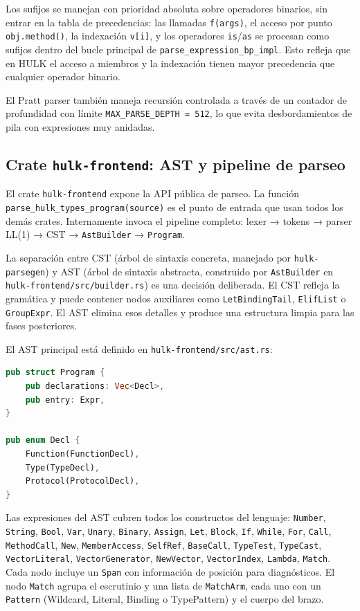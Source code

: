 \documentclass[12pt,letterpaper]{article}
\newcommand{\hulk}{\textsc{HULK}}
\newcommand{\src}[1]{\texttt{#1}}
\begin{document}
Los sufijos se manejan con prioridad absoluta sobre operadores binarios, sin entrar en la tabla de precedencias: las llamadas \src{f(args)}, el acceso por punto \src{obj.method()}, la indexación \src{v[i]}, y los operadores \src{is}/\src{as} se procesan como sufijos dentro del bucle principal de \src{parse\_expression\_bp\_impl}. Esto refleja que en \hulk{} el acceso a miembros y la indexación tienen mayor precedencia que cualquier operador binario.

El Pratt parser también maneja recursión controlada a través de un contador de profundidad con límite \src{MAX\_PARSE\_DEPTH = 512}, lo que evita desbordamientos de pila con expresiones muy anidadas.

\subsection{Crate \src{hulk-frontend}: AST y pipeline de parseo}

El crate \src{hulk-frontend} expone la API pública de parseo. La función \src{parse\_hulk\_types\_program(source)} es el punto de entrada que usan todos los demás crates. Internamente invoca el pipeline completo: lexer → tokens → parser LL(1) → CST → \src{AstBuilder} → \src{Program}.

La separación entre CST (árbol de sintaxis concreta, manejado por \src{hulk-parsegen}) y AST (árbol de sintaxis abstracta, construido por \src{AstBuilder} en \src{hulk-frontend/src/builder.rs}) es una decisión deliberada. El CST refleja la gramática y puede contener nodos auxiliares como \src{LetBindingTail}, \src{ElifList} o \src{GroupExpr}. El AST elimina esos detalles y produce una estructura limpia para las fases posteriores.

El AST principal está definido en \src{hulk-frontend/src/ast.rs}:

\begin{lstlisting}[language=Rust,caption={Estructura raíz del AST}]
pub struct Program {
    pub declarations: Vec<Decl>,
    pub entry: Expr,
}

pub enum Decl {
    Function(FunctionDecl),
    Type(TypeDecl),
    Protocol(ProtocolDecl),
}
\end{lstlisting}

Las expresiones del AST cubren todos los constructos del lenguaje: \src{Number}, \src{String}, \src{Bool}, \src{Var}, \src{Unary}, \src{Binary}, \src{Assign}, \src{Let}, \src{Block}, \src{If}, \src{While}, \src{For}, \src{Call}, \src{MethodCall}, \src{New}, \src{MemberAccess}, \src{SelfRef}, \src{BaseCall}, \src{TypeTest}, \src{TypeCast}, \src{VectorLiteral}, \src{VectorGenerator}, \src{NewVector}, \src{VectorIndex}, \src{Lambda}, \src{Match}. Cada nodo incluye un \src{Span} con información de posición para diagnósticos. El nodo \src{Match} agrupa el escrutinio y una lista de \src{MatchArm}, cada uno con un \src{Pattern} (Wildcard, Literal, Binding o TypePattern) y el cuerpo del brazo.
\end{document}
